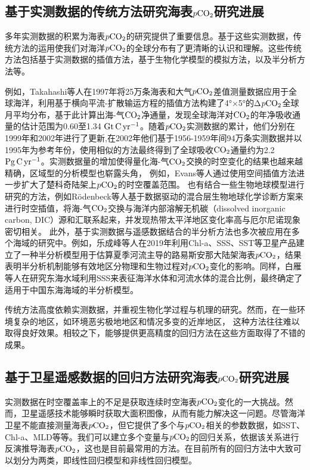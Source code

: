 \subsection{基于实测数据的传统方法研究海表\texorpdfstring{$p\rm CO_2$}{}研究进展}
多年实测数据的积累为海表$p\rm CO_2$的研究提供了重要信息。基于这些实测数据，传统方法的运用使我们对海洋$p\rm CO_2$的全球分布有了更清晰的认识和理解。这些传统方法包括基于实测数据的插值方法\cite{takahashi1997global,takahashi1999net,takahashi2002global}，基于生物化学模型的模拟方法\cite{rodenbeck2014interannual}，以及半分析方法\cite{le2019estimating,bai2015mechanistic,chen2017estimating}等。

例如，Takahashi等人\cite{takahashi1997global}在1997年将25万条海表和大气$p\rm CO_2$差值测量数据应用于全球海洋，利用基于横向平流-扩散输运方程的插值方法构建了4°×5°的Δ$p\rm CO_2$全球月平均分布，基于此计算出海-气$\rm CO_2$净通量，发现全球海洋对$\rm CO_2$的年净吸收通量的估计范围为0.60至1.34 $\rm Gt \, C\, yr^{-1}$。随着$p\rm CO_2$实测数据的累计，他们分别在1999年\cite{takahashi1999net}和2002年\cite{takahashi2002global}进行了更新,在2002年\cite{takahashi2002global}他们基于1956-1959年间94万条实测数据并以1995年为参考年份，使用相似的方法最终得到了全球吸收$\rm CO_2$通量约为2.2$\rm Pg\, C\, yr^{-1}$。实测数据量的增加使得量化海-气$\rm CO_2$交换的时空变化的结果也越来越精确，区域型的分析模型也崭露头角，
例如，Evans等人\cite{evans2015sea}通过使用空间插值方法进一步扩大了楚科奇陆架上$p\rm CO_2$的时空覆盖范围。
也有结合一些生物地球模型进行研究的方法，例如Rödenbeck等人\cite{rodenbeck2014interannual}基于数据驱动的混合层生物地球化学诊断方案来进行时空插值，将海-气$\rm CO_2$交换与海洋内部溶解无机碳（dissolved inorganic carbon, DIC）源和汇联系起来，并发现热带太平洋地区变化率高与厄尔尼诺现象密切相关。
此外，基于实测数据与遥感数据结合的半分析方法也多次被应用在多个海域的研究中。例如，乐成峰等人\cite{le2019estimating}在2019年利用Chl-a、SSS、SST等卫星产品建立了一种半分析模型用于估算夏季河流主导的路易斯安那大陆架海表$p\rm CO_2$，结果表明半分析机制能够有效地区分物理和生物过程对$p\rm CO_2$变化的影响。同样，白雁等人\cite{bai2015mechanistic}在研究东海水域利用SSS来表征海洋水体和河流水体的混合比例，最终确定了适用于中国东海海域的半分析模型。

传统方法高度依赖实测数据，并重视生物化学过程与机理的研究。然而，在一些环境复杂的地区，如环境恶劣极地地区和情况多变的近岸地区，
这种方法往往难以取得良好效果。相较之下，能够提供更高精度的回归方法在这些方面取得了不错的成果。

\subsection{基于卫星遥感数据的回归方法研究海表\texorpdfstring{$p\rm CO_2$}{}研究进展}
实测数据在时空覆盖率上的不足是获取连续时空海表$p\rm CO_2$变化的一大挑战。然而，卫星遥感技术能够瞬时获取大面积图像，从而有能力解决这一问题。尽管海洋卫星不能直接测量海表$p\rm CO_2$，但它提供了多个与$p\rm CO_2$相关的参数数据，如SST、Chl-a、MLD等等。我们可以建立多个变量与$p\rm CO_2$的回归关系，依据该关系进行反演推导海表$p\rm CO_2$，这也是目前最常用的方法。在目前所有的回归方法中大致可以划分为两类，即线性回归模型和非线性回归模型。


